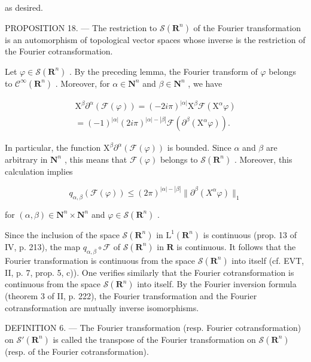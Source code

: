 as desired.

PROPOSITION 18. --- The restriction to \(\mathcal{S}(\mathbf{R}^{n})\) of the Fourier transformation is an automorphism of topological vector spaces whose inverse is the restriction of the Fourier cotransformation.

Let \(\varphi\in\mathcal{S}(\mathbf{R}^{n})\) . By the preceding lemma, the Fourier transform of \(\varphi\) belongs to \(\mathcal{C}^{\infty}(\mathbf{R}^{n})\) . Moreover, for \(\alpha\in\mathbf{N}^{n}\) and \(\beta\in\mathbf{N}^{n}\) , we have

\[
\begin{array}{r} \mathrm{X} ^ {\beta} \partial^ {\alpha} (\mathcal {F} (\varphi)) = (- 2 i \pi) ^ {| \alpha |} \mathrm{X} ^ {\beta} \mathcal {F} (\mathrm{X} ^ {\alpha} \varphi) \\ = (- 1) ^ {| \alpha |} (2 i \pi) ^ {| \alpha | - | \beta |} \mathcal {F} (\partial^ {\beta} (\mathrm{X} ^ {\alpha} \varphi)). \end{array}
\]

In particular, the function \(\mathrm{X}^{\beta}\partial^{\alpha}(\mathcal{F}(\varphi))\) is bounded. Since \(\alpha\) and \(\beta\) are arbitrary in \(\mathbf{N}^{n}\) , this means that \(\mathcal{F}(\varphi)\) belongs to \(\mathcal{S}(\mathbf{R}^{n})\) . Moreover, this calculation implies

\[
q _ {\alpha , \beta} (\mathcal {F} (\varphi)) \leqslant (2 \pi) ^ {| \alpha | - | \beta |} \| \partial^ {\beta} (X ^ {\alpha} \varphi) \| _ {1}
\]

for \((\alpha, \beta) \in \mathbf{N}^n \times \mathbf{N}^n\) and \(\varphi \in \mathcal{S}(\mathbf{R}^n)\) .

Since the inclusion of the space \(\mathcal{S}(\mathbf{R}^{n})\) in \(\mathrm{L}^{1}(\mathbf{R}^{n})\) is continuous (prop. 13 of IV, p. 213), the map \(q_{\alpha,\beta} \circ \mathcal{F}\) of \(\mathcal{S}(\mathbf{R}^{n})\) in \(\mathbf{R}\) is continuous. It follows that the Fourier transformation is continuous from the space \(\mathcal{S}(\mathbf{R}^{n})\) into itself (cf. EVT, II, p. 7, prop. 5, c)). One verifies similarly that the Fourier cotransformation is continuous from the space \(\mathcal{S}(\mathbf{R}^{n})\) into itself. By the Fourier inversion formula (theorem 3 of II, p. 222), the Fourier transformation and the Fourier cotransformation are mutually inverse isomorphisms.

DEFINITION 6. --- The Fourier transformation (resp. Fourier cotransformation) on \(\mathcal{S}'(\mathbf{R}^n)\) is called the transpose of the Fourier transformation on \(\mathcal{S}(\mathbf{R}^n)\) (resp. of the Fourier cotransformation).

